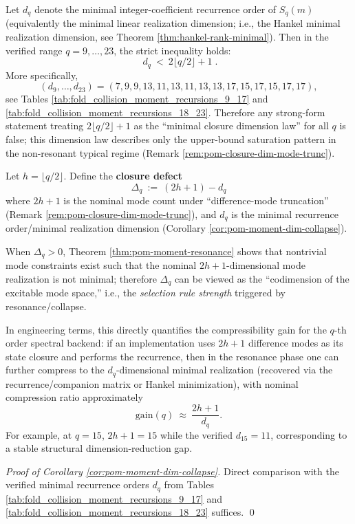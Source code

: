 \begin{corollary}[Failure of the closure dimension extrapolation at \texorpdfstring{$q\ge 9$}{q>=9} (counterexample family)]\label{cor:pom-moment-dim-collapse}
Let \(d_q\) denote the minimal integer-coefficient recurrence order of \(S_q(m)\) (equivalently the minimal linear realization dimension; i.e., the Hankel minimal realization dimension, see Theorem \ref{thm:hankel-rank-minimal}).
Then in the verified range \(q=9,\dots,23\), the strict inequality holds:
\[
\boxed{\;
d_q\ <\ 2\lfloor q/2\rfloor+1\; }.
\]
More specifically,
\[
(d_9,\dots,d_{23})=(7,9,9,13,11,13,11,13,13,17,15,17,15,17,17),
\]
see Tables \ref{tab:fold_collision_moment_recursions_9_17} and \ref{tab:fold_collision_moment_recursions_18_23}.
Therefore any strong-form statement treating \(2\lfloor q/2\rfloor+1\) as the ``minimal closure dimension law'' for all \(q\) is false; this dimension law describes only the upper-bound saturation pattern in the non-resonant typical regime (Remark \ref{rem:pom-closure-dim-mode-trunc}).
\end{corollary}
\begin{definition}\label{def:pom-closure-defect-deltaq}
Let \(h=\lfloor q/2\rfloor\).
Define the \textbf{closure defect}
\[
\boxed{\;
\Delta_q\ :=\ (2h+1)-d_q\;}
\]
where \(2h+1\) is the nominal mode count under ``difference-mode truncation'' (Remark \ref{rem:pom-closure-dim-mode-trunc}), and \(d_q\) is the minimal recurrence order/minimal realization dimension (Corollary \ref{cor:pom-moment-dim-collapse}).
\end{definition}
\begin{remark}\label{rem:pom-closure-defect-selection-rule}
When \(\Delta_q>0\), Theorem \ref{thm:pom-moment-resonance} shows that nontrivial mode constraints exist such that the nominal \(2h+1\)-dimensional mode realization is not minimal; therefore \(\Delta_q\) can be viewed as the ``codimension of the excitable mode space,'' i.e., the \emph{selection rule strength} triggered by resonance/collapse.
\par
In engineering terms, this directly quantifies the compressibility gain for the \(q\)-th order spectral backend: if an implementation uses \(2h+1\) difference modes as its state closure and performs the recurrence, then in the resonance phase one can further compress to the \(d_q\)-dimensional minimal realization (recovered via the recurrence/companion matrix or Hankel minimization), with nominal compression ratio approximately
\[
\mathrm{gain}(q)\ \approx\ \frac{2h+1}{d_q}.
\]
For example, at \(q=15\), \(2h+1=15\) while the verified \(d_{15}=11\), corresponding to a stable structural dimension-reduction gap.
\end{remark}
\begin{proof}[Proof of Corollary \ref{cor:pom-moment-dim-collapse}]
Direct comparison with the verified minimal recurrence orders \(d_q\) from Tables \ref{tab:fold_collision_moment_recursions_9_17} and \ref{tab:fold_collision_moment_recursions_18_23} suffices. \qed
\end{proof}


